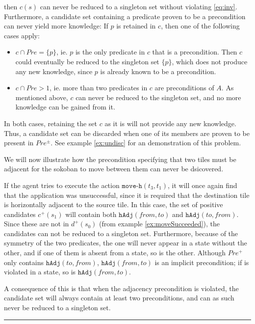 \documentclass[../../Master.tex]{subfiles}
\begin{document}
then $c(s)$ can never be reduced to a singleton set without violating \eqref{eq:inv}. Furthermore, a candidate set containing a predicate proven to be a precondition can never yield more knowledge: If $p$ is retained in $c$, then one of the following cases apply:
\begin{itemize}
    \item $c \cap Pre = \{ p \}$, ie. $p$ is the only predicate in $c$ that is a precondition. Then $c$ could eventually be reduced to the singleton set $\{ p \}$, which does not produce any new knowledge, since $p$ is already known to be a precondition.

    \item $c \cap Pre > 1$, ie. more than two predicates in $c$ are preconditions of $A$. As mentioned above, $c$ can never be reduced to the singleton set, and no more knowledge can be gained from it.
\end{itemize}
In both cases, retaining the set $c$ as it is will not provide any new knowledge. Thus, a candidate set can be discarded when one of its members are proven to be present in $Pre^{\pm}$. See example \ref{ex:undisc} for an demonstration of this problem.

\begin{example} \label{ex:undisc}
    We will now illustrate how the precondition specifying that two tiles must be adjacent for the sokoban to move between them can never be dsicovered.

    If the agent tries to execute the action $\texttt{move-h}(t_3, t_1)$, it will once again find that the application was unsuccessful, since it is required that the destination tile is horizontally adjacent to the source tile. In this case, the set of positive candidates $c^+(s_1)$ will contain both $\texttt{hAdj}(from, to)$ and $\texttt{hAdj}(to, from)$. Since these are not in $d^+(s_0)$ (from example \ref{ex:moveSucceeded}), the candidates can not be reduced to a singleton set. Furthermore, because of the symmetry of the two predicates, the one will never appear in a state without the other, and if one of them is absent from a state, so is the other. Although $Pre^+$ only contains $\texttt{hAdj}(to, from)$, $\texttt{hAdj}(from, to)$ is an implicit precondition; if is violated in a state, so is $\texttt{hAdj}(from, to)$.

    A consequence of this is that when the adjacency precondition is violated, the candidate set will always contain at least two preconditions, and can as such never be reduced to a singleton set.

    \noindent\rule{\textwidth}{1pt}
\end{example}
\end{document}
